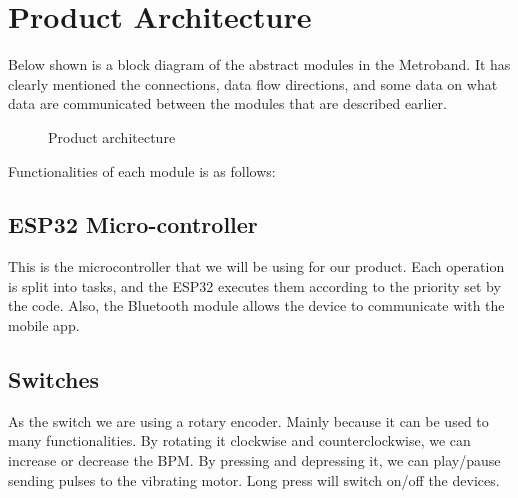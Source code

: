 \documentclass{article}
\begin{document}
        \section{Product Architecture}
        Below shown is a block diagram of the abstract modules in the Metroband. It has clearly mentioned the connections, data flow directions, and some data on what data are communicated between the modules that  are described earlier.

            \begin{figure}[!htb]
                \centering
                \caption{Product architecture}
            \end{figure}

        Functionalities of each module is as follows:
        \subsection{ESP32 Micro-controller}
        This is the microcontroller that we will be using for our product. Each operation is split into tasks, and the ESP32 executes them according to the priority set by the code. Also, the Bluetooth module allows the device to communicate with the mobile app.

        \subsection{Switches}
        As the switch we are using a rotary encoder. Mainly because it can be used to many functionalities. By rotating it clockwise and counterclockwise, we can increase or decrease the BPM. By pressing and depressing it, we can play/pause sending pulses to the vibrating motor. Long press will switch on/off the devices.
\end{document}
